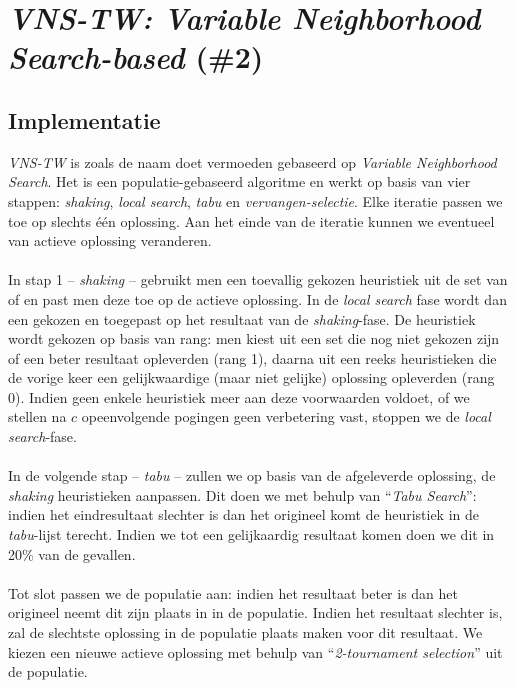 \section{\emph{VNS-TW: Variable Neighborhood Search-based} (\#2)}
\subsection{Implementatie}
\emph{VNS-TW}\cite{chesc-vns-tw} is zoals de naam doet vermoeden gebaseerd op \emph{Variable Neighborhood Search}\cite{hom/vns}. Het is een populatie-gebaseerd algoritme en werkt op basis van vier stappen: \emph{shaking}, \emph{local search}, \emph{tabu} en \emph{vervangen-selectie}. Elke iteratie passen we toe op slechts \'e\'en oplossing. Aan het einde van de iteratie kunnen we eventueel van actieve oplossing veranderen.

\paragraph{}
In stap 1 -- \emph{shaking} -- gebruikt men een toevallig gekozen heuristiek uit de set van \abmt{} of \abrr{} \abllhn{} en past men deze toe op de actieve oplossing. In de \emph{local search} fase wordt dan een \abls{} \abh{} gekozen en toegepast op het resultaat van de \emph{shaking}-fase. De heuristiek wordt gekozen op basis van rang: men kiest uit een set \abhn{} die nog niet gekozen zijn of een beter resultaat opleverden (rang 1), daarna uit een reeks heuristieken die de vorige keer een gelijkwaardige (maar niet gelijke) oplossing opleverden (rang 0). Indien geen enkele heuristiek meer aan deze  voorwaarden voldoet, of we stellen na $c$ opeenvolgende pogingen geen verbetering vast, stoppen we de \emph{local search}-fase.

\paragraph{}
In de volgende stap -- \emph{tabu} -- zullen we op basis van de afgeleverde oplossing, de \emph{shaking} heuristieken aanpassen. Dit doen we met behulp van ``\emph{Tabu Search}''\cite{DBLP:journals/informs/Glover89}: indien het eindresultaat slechter is dan het origineel komt de heuristiek in de \emph{tabu}-lijst terecht. Indien we tot een gelijkaardig resultaat komen doen we dit in 20\% van de gevallen.

\paragraph{}
Tot slot passen we de populatie aan: indien het resultaat beter is dan het origineel neemt dit zijn plaats in in de populatie. Indien het resultaat slechter is, zal de slechtste oplossing in de populatie plaats maken voor dit resultaat. We kiezen een nieuwe actieve oplossing met behulp van ``\emph{2-tournament selection}''\cite{Miller95geneticalgorithms} uit de populatie.